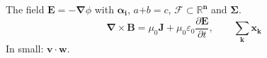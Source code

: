 \documentclass[11pt]{article}
\begin{document}
The field $\boldsymbol{E} = -\boldsymbol{\nabla}\phi$ with $\boldsymbol{\alpha}_{\boldsymbol{i}}$, $a \boldsymbol{+} b \boldsymbol{=} c$,
$\boldsymbol{\mathcal{F}} \subset \boldsymbol{\mathbb{R}}^{\boldsymbol{n}}$ and $\boldsymbol{\Sigma}$.
\[ \boldsymbol{\nabla}\times\boldsymbol{B} = \mu_0\boldsymbol{J} + \mu_0\varepsilon_0 \frac{\partial \boldsymbol{E}}{\partial t}, \qquad \boldsymbol{\sum_{k} x_k} \]
{\small In small: $\boldsymbol{v}\cdot\boldsymbol{w}$.}
\end{document}
